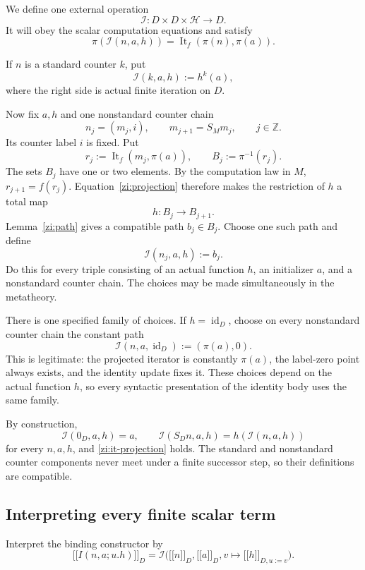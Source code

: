 \documentclass[11pt]{article}
\theoremstyle{definition}
\newcommand{\llbracket}{\mathopen{[\![}}
\newcommand{\rrbracket}{\mathclose{]\!]}}
\begin{document}
We define one external operation
\[
\mathcal I:D\times D\times\mathscr H\longrightarrow D.
\]
It will obey the scalar computation equations and satisfy
\[
\pi(\mathcal I(n,a,h))
=\operatorname{It}_f(\pi(n),\pi(a)).
\tag{Iterator projection}\label{zi:it-projection}
\]

If \(n\) is a standard counter \(k\), put
\[
\mathcal I(k,a,h):=h^k(a),
\]
where the right side is actual finite iteration on \(D\).

Now fix \(a,h\) and one nonstandard counter chain
\[
n_j=(m_j,i),\qquad
m_{j+1}=S_Mm_j,\qquad j\in\mathbb Z.
\]
Its counter label \(i\) is fixed. Put
\[
r_j:=\operatorname{It}_f(m_j,\pi(a)),\qquad
B_j:=\pi^{-1}(r_j).
\]
The sets \(B_j\) have one or two elements. By the computation law in \(M\),
\(r_{j+1}=f(r_j)\). Equation~\eqref{zi:projection} therefore makes the restriction of \(h\) a total map
\[
h:B_j\longrightarrow B_{j+1}.
\]
Lemma~\ref{zi:path} gives a compatible path \(b_j\in B_j\). Choose one such path and define
\[
\mathcal I(n_j,a,h):=b_j.
\]
Do this for every triple consisting of an actual function \(h\), an initializer \(a\), and a nonstandard counter chain. The choices may be made simultaneously in the metatheory.

There is one specified family of choices. If \(h=\operatorname{id}_D\), choose on every nonstandard counter chain the constant path
\[
\mathcal I(n,a,\operatorname{id}_D):=(\pi(a),0).
\tag{Identity choice}\label{zi:identity-choice}
\]
This is legitimate: the projected iterator is constantly \(\pi(a)\), the label-zero point always exists, and the identity update fixes it. These choices depend on the actual function \(h\), so every syntactic presentation of the identity body uses the same family.

By construction,
\[
\mathcal I(0_D,a,h)=a,\qquad
\mathcal I(S_Dn,a,h)=h(\mathcal I(n,a,h))
\]
for every \(n,a,h\), and \eqref{zi:it-projection} holds. The standard and nonstandard counter components never meet under a finite successor step, so their definitions are compatible.

\subsection{Interpreting every finite scalar term}

Interpret the binding constructor by
\[
\llbracket I(n,a;u.h)\rrbracket_D
=
\mathcal I\bigl(\llbracket n\rrbracket_D,
              \llbracket a\rrbracket_D,
              v\mapsto\llbracket h\rrbracket_{D,u:=v}\bigr).
\]
\end{document}
